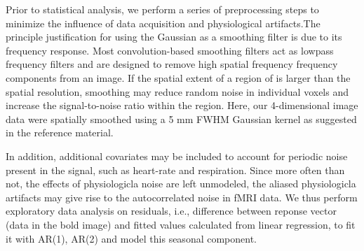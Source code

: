 \par \indent Prior to statistical analysis, we perform a series of
preprocessing steps to minimize the influence of data acquisition and 
physiological artifacts.The principle justification for using the Gaussian as a 
smoothing filter is due to its frequency response. Most convolution-based 
smoothing filters act as lowpass frequency filters and are designed to remove 
high spatial frequency frequency components from an image. If the spatial 
extent of a region of is larger than the spatial resolution, smoothing may 
reduce random noise in individual voxels and increase the signal-to-noise ratio 
within the region. Here, our 4-dimensional image data  were spatially smoothed 
using a 5 mm FWHM Gaussian kernel as suggested in the reference material.
\par \indent In addition, additional covariates may be included to account for
periodic noise present in the signal, such as heart-rate and respiration. 
Since more often than not, the effects of physiologicla noise are left
unmodeled, the aliased physiologicla artifacts may give rise to the
autocorrelated noise in fMRI data. We thus perform exploratory data analysis on 
residuals, i.e., difference between reponse vector (data in the bold image) and 
fitted values calculated from linear regression, to fit it with AR(1), AR(2) 
and model this seasonal component. 
